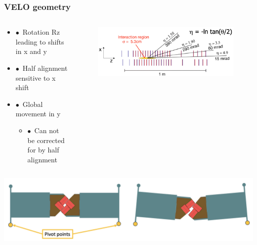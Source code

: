 \documentclass[aspectratio=1610, 12pt, xcolor=dvipsnames]{beamer}
\begin{document}
\begin{frame}\frametitle{VELO geometry}
  \begin{columns}
    \begin{column}[c]{0.5\textwidth}
      \begin{itemize}
        \item $\bullet$\, Rotation Rz leading to shifts in x and y
        \item $\bullet$\, Half alignment sensitive to x shift
        \item $\bullet$\, Global movement in y
        \begin{itemize}
          \item $\bullet$\, Can not be corrected for by half alignment
        \end{itemize}
      \end{itemize}    
    \end{column}
    \begin{column}[c]{0.5\textwidth}
      \begin{figure}
        \centering
        \includegraphics[width=\textwidth]{plots/velo_layers_all.png}
      \end{figure}
    \end{column}
  \end{columns}
  \includegraphics[width=\textwidth]{plots/velo_rotation.png}
\end{frame}
\end{document}
